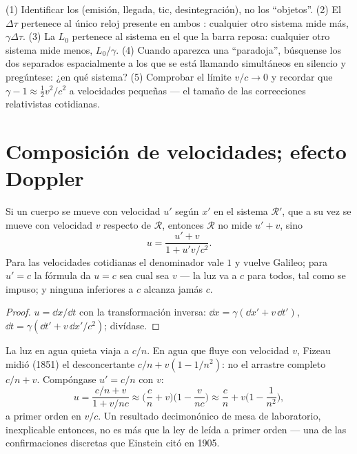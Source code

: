 \begin{method}\label{met:b3:relativistic-kinematics:method}
(1) Identificar los \emph{} (emisión, llegada, tic, desintegración),
no los ``objetos''. (2) El  $\Delta\tau$ pertenece al único
reloj presente en ambos : cualquier otro sistema mide más,
$\gamma\Delta\tau$. (3) La  $L_0$ pertenece al sistema en el
que la barra reposa: cualquier otro sistema mide menos, $L_0/\gamma$.
(4) Cuando aparezca una ``paradoja'', búsquense los dos  separados
espacialmente a los que se está llamando simultáneos en silencio y
pregúntese: ¿en qué sistema? (5) Comprobar el límite $v/c \to 0$ y recordar
que $\gamma - 1 \approx \tfrac12 v^2/c^2$ a velocidades pequeñas --- el
tamaño de las correcciones relativistas cotidianas.
\end{method}

\section{Composición de velocidades; efecto Doppler}

\begin{proposition}\label{prop:b3:relativistic-kinematics:addition}
Si un cuerpo se mueve con velocidad $u'$ según $x'$ en el sistema
$\mathcal R'$, que a su vez se mueve con velocidad $v$ respecto de
$\mathcal R$, entonces $\mathcal R$ no mide $u' + v$, sino
\[
u = \frac{u' + v}{1 + u'v/c^2} .
\]
Para las velocidades cotidianas el denominador vale $1$ y vuelve Galileo;
para $u' = c$ la fórmula da $u = c$ sea cual sea $v$ --- la luz va a $c$
para todos, tal como se impuso; y ninguna 
inferiores a $c$ alcanza jamás $c$.
\end{proposition}

\begin{proof}
$u = \dd x/\dd t$ con la transformación inversa: $\dd x =
\gamma(\dd x' + v\,\dd t')$, $\dd t = \gamma(\dd t' + v\,\dd x'/c^2)$;
divídase.
\end{proof}

\begin{example}\label{ex:b3:relativistic-kinematics:fizeau}
La luz en agua quieta viaja a $c/n$. En agua que fluye con velocidad $v$,
Fizeau midió (1851) el desconcertante $c/n + v(1 - 1/n^2)$: no el arrastre
completo $c/n + v$. Compóngase $u' = c/n$ con $v$:
\[
u = \frac{c/n + v}{1 + v/nc}
\approx \Big(\frac{c}{n} + v\Big)\Big(1 - \frac{v}{nc}\Big)
\approx \frac{c}{n} + v\Big(1 - \frac{1}{n^2}\Big) ,
\]
a primer orden en $v/c$. Un resultado decimonónico de mesa de laboratorio,
inexplicable entonces, no es más que la ley de 
leída a primer orden --- una de las confirmaciones discretas que Einstein
citó en 1905.
\end{example}

